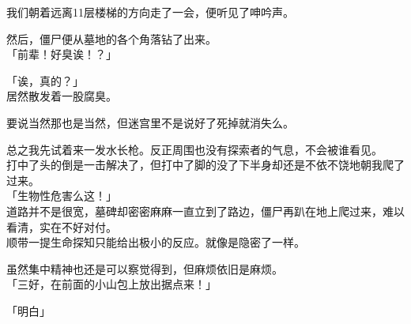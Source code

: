 我们朝着远离11层楼梯的方向走了一会，便听见了呻吟声。

然后，僵尸便从墓地的各个角落钻了出来。\\

「前辈！好臭诶！？」

「诶，真的？」\\

居然散发着一股腐臭。

要说当然那也是当然，但迷宫里不是说好了死掉就消失么。

总之我先试着来一发水长枪。反正周围也没有探索者的气息，不会被谁看见。\\

打中了头的倒是一击解决了，但打中了脚的没了下半身却还是不依不饶地朝我爬了过来。\\

「生物性危害么这！」\\

道路并不是很宽，墓碑却密密麻麻一直立到了路边，僵尸再趴在地上爬过来，难以看清，实在不好对付。\\

顺带一提生命探知只能给出极小的反应。就像是隐密了一样。

虽然集中精神也还是可以察觉得到，但麻烦依旧是麻烦。\\

「三好，在前面的小山包上放出据点来！」

「明白」\\

